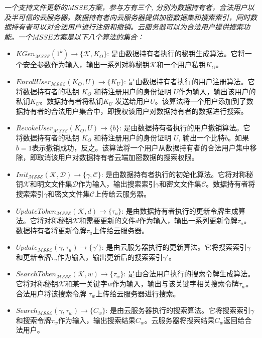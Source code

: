 \begin{definition}\label{def:MSSE}
  {\itshape
      一个支持文件更新的$MSSE$方案，参与方有三个, 分别为数据持有者，合法用户以及半可信的云服务器。数据持有者向云服务器提供加密数据集和搜索索引，同时数据持有者可以对合法用户进行注册和撤销。云服务器可以为合法用户提供搜索功能。一个$MSSE$方案是以下八个算法的集合：
      \begin{itemize}
        \item $KGen_{\mathcal{MSSE}}(1^k) \rightarrow \{\mathcal{K},K_O\}$: 是由数据持有者执行的秘钥生成算法。它将一个安全参数作为输入，输出一系列对称秘钥$\mathcal{K}$和一个用户私钥$K_O$。
        \item $EnrollUser_{\mathcal{MSSE}}(K_O,U) \rightarrow \{K_U\}$: 是由数据持有者执行的用户注册算法。它将数据持有者的私钥 $K_O$ 和待注册用户的身份证明 $U$作为输入，输出该用户的私钥$K_U$。数据持有者将私钥$K_U$ 发送给用户$U$。该算法将一个用户添加到了数据持有者的合法用户集合中，即授权该用户对数据持有者的数据进行搜索。
        \item $RevokeUser_{\mathcal{MSSE}}(K_O,U) \rightarrow \{b\}$: 是由数据持有者执行的用户撤销算法。它将数据持有者的私钥 $K_O$ 和待注册用户的身份证明 $U$, 输出一个比特$b$。如果$b=1$表示撤销成功，反之。该算法将一个用户从数据持有者的合法用户集中移除，即取消该用户对数据持有者云端加密数据的搜索权限。
        \item $Init_{\mathcal{MSSE}}(\mathcal{K}, \mathcal{D}) \rightarrow \{\gamma, \mathcal{C}\}$: 是由数据持有者执行的初始化算法。它将对称秘钥$\mathcal{K}$和明文文件集$\mathcal{D}$作为输入，输出搜索索引$\gamma$和密文文件集$\mathcal{C}$。数据持有者将搜索索引$\gamma$和密文文件集$\mathcal{C}$上传给云服务器。
        \item $UpdateToken_{\mathcal{MSSE}}(\mathcal{K}, d) \rightarrow \{\tau_u\}$: 是由数据持有者执行的更新令牌生成算法。它将对称秘钥$\mathcal{K}$和需要更新的文件$d$作为输入，输出一系列更新令牌$\tau_u$。数据持有者将更新令牌$\tau_u$上传给云服务器。
        \item $Update_{\mathcal{MSSE}}(\gamma, \tau_u) \rightarrow \{\gamma'\}$: 是由云服务器执行的更新算法。它将搜索索引$\gamma$和更新令牌$\tau_u$作为输入，输出更新后的搜索索引$\gamma'$。
        \item $SearchToken_{\mathcal{MSSE}}(\mathcal{K}, w) \rightarrow \{\tau_{w}\}$: 是由合法用户执行的搜索令牌生成算法。它将对称秘钥$\mathcal{K}$和某一关键字$w$作为输入，输出与该关键字相关搜索令牌$\tau_{w}$。合法用户将该搜索令牌 $\tau_{w}$上传给云服务器进行搜索。
        \item $Search_{\mathcal{MSSE}}(\gamma, \tau_{w}) \rightarrow \{C_w\}$: 是由云服务器执行的搜索算法。它将搜索索引$\gamma$和搜索令牌$\tau_{w}$作为输入，输出搜索结果$C_w$。云服务器将搜索结果$C_w$返回给合法用户。
      \end{itemize}
      }
\end{definition}

